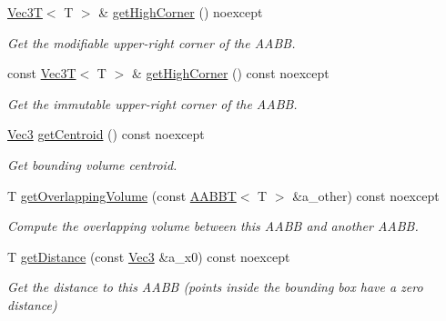 \begin{DoxyCompactItemize}
\mbox{\label{classBoundingVolumes_1_1AABBT_a2ecaeccecdb8882051516409e5749ef9}} 
\hyperlink{classVec3T}{Vec3T}$<$ T $>$ \& \hyperlink{classBoundingVolumes_1_1AABBT_a2ecaeccecdb8882051516409e5749ef9}{get\+High\+Corner} () noexcept
\begin{DoxyCompactList}\small\item\em Get the modifiable upper-\/right corner of the A\+A\+BB. \end{DoxyCompactList}\item 
\mbox{\label{classBoundingVolumes_1_1AABBT_aef8dcd08ea8726cdcd3d361d33c4d554}} 
const \hyperlink{classVec3T}{Vec3T}$<$ T $>$ \& \hyperlink{classBoundingVolumes_1_1AABBT_aef8dcd08ea8726cdcd3d361d33c4d554}{get\+High\+Corner} () const noexcept
\begin{DoxyCompactList}\small\item\em Get the immutable upper-\/right corner of the A\+A\+BB. \end{DoxyCompactList}\item 
\mbox{\label{classBoundingVolumes_1_1AABBT_a7c98cb4cec1eb672755c9c469ca44990}} 
\hyperlink{classBoundingVolumes_1_1AABBT_aa968c6b21a7f02e1cbfc03d26c7e67b4}{Vec3} \hyperlink{classBoundingVolumes_1_1AABBT_a7c98cb4cec1eb672755c9c469ca44990}{get\+Centroid} () const noexcept
\begin{DoxyCompactList}\small\item\em Get bounding volume centroid. \end{DoxyCompactList}\item 
T \hyperlink{classBoundingVolumes_1_1AABBT_ae65563ac6f3851f8fb05e0c98613fc0d}{get\+Overlapping\+Volume} (const \hyperlink{classBoundingVolumes_1_1AABBT}{A\+A\+B\+BT}$<$ T $>$ \&a\+\_\+other) const noexcept
\begin{DoxyCompactList}\small\item\em Compute the overlapping volume between this A\+A\+BB and another A\+A\+BB. \end{DoxyCompactList}\item 
T \hyperlink{classBoundingVolumes_1_1AABBT_ad883975a0926c0755a978283137f378f}{get\+Distance} (const \hyperlink{classBoundingVolumes_1_1AABBT_aa968c6b21a7f02e1cbfc03d26c7e67b4}{Vec3} \&a\+\_\+x0) const noexcept
\begin{DoxyCompactList}\small\item\em Get the distance to this A\+A\+BB (points inside the bounding box have a zero distance) \end{DoxyCompactList}\item 

\end{DoxyCompactItemize}

